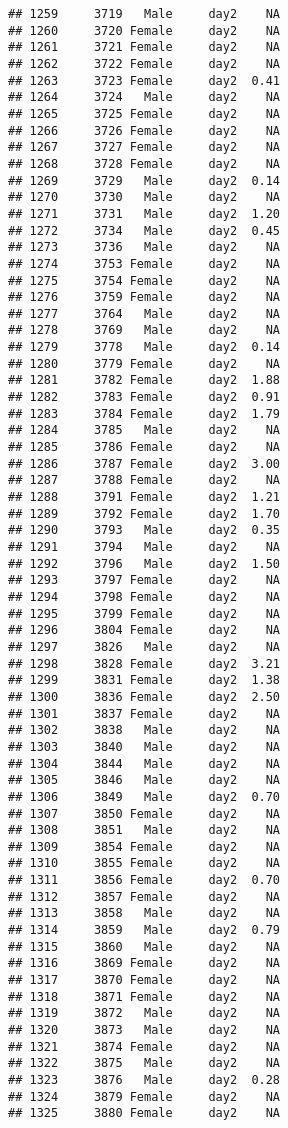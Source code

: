 \documentclass[
]{article}
\begin{document}
\begin{verbatim}
## 1259     3719   Male     day2    NA
## 1260     3720 Female     day2    NA
## 1261     3721 Female     day2    NA
## 1262     3722 Female     day2    NA
## 1263     3723 Female     day2  0.41
## 1264     3724   Male     day2    NA
## 1265     3725 Female     day2    NA
## 1266     3726 Female     day2    NA
## 1267     3727 Female     day2    NA
## 1268     3728 Female     day2    NA
## 1269     3729   Male     day2  0.14
## 1270     3730   Male     day2    NA
## 1271     3731   Male     day2  1.20
## 1272     3734   Male     day2  0.45
## 1273     3736   Male     day2    NA
## 1274     3753 Female     day2    NA
## 1275     3754 Female     day2    NA
## 1276     3759 Female     day2    NA
## 1277     3764   Male     day2    NA
## 1278     3769   Male     day2    NA
## 1279     3778   Male     day2  0.14
## 1280     3779 Female     day2    NA
## 1281     3782 Female     day2  1.88
## 1282     3783 Female     day2  0.91
## 1283     3784 Female     day2  1.79
## 1284     3785   Male     day2    NA
## 1285     3786 Female     day2    NA
## 1286     3787 Female     day2  3.00
## 1287     3788 Female     day2    NA
## 1288     3791 Female     day2  1.21
## 1289     3792 Female     day2  1.70
## 1290     3793   Male     day2  0.35
## 1291     3794   Male     day2    NA
## 1292     3796   Male     day2  1.50
## 1293     3797 Female     day2    NA
## 1294     3798 Female     day2    NA
## 1295     3799 Female     day2    NA
## 1296     3804 Female     day2    NA
## 1297     3826   Male     day2    NA
## 1298     3828 Female     day2  3.21
## 1299     3831 Female     day2  1.38
## 1300     3836 Female     day2  2.50
## 1301     3837 Female     day2    NA
## 1302     3838   Male     day2    NA
## 1303     3840   Male     day2    NA
## 1304     3844   Male     day2    NA
## 1305     3846   Male     day2    NA
## 1306     3849   Male     day2  0.70
## 1307     3850 Female     day2    NA
## 1308     3851   Male     day2    NA
## 1309     3854 Female     day2    NA
## 1310     3855 Female     day2    NA
## 1311     3856 Female     day2  0.70
## 1312     3857 Female     day2    NA
## 1313     3858   Male     day2    NA
## 1314     3859   Male     day2  0.79
## 1315     3860   Male     day2    NA
## 1316     3869 Female     day2    NA
## 1317     3870 Female     day2    NA
## 1318     3871 Female     day2    NA
## 1319     3872   Male     day2    NA
## 1320     3873   Male     day2    NA
## 1321     3874 Female     day2    NA
## 1322     3875   Male     day2    NA
## 1323     3876   Male     day2  0.28
## 1324     3879 Female     day2    NA
## 1325     3880 Female     day2    NA

\end{verbatim}
\end{document}
